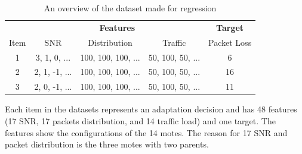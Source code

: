 \documentclass[a4paper,12pt]{article}
\begin{document}
\begin{table}[H]
	\centering
	\begin{tabular}{c|c|c|c|c}
		\hline
		\multicolumn{1}{c|}{} & \multicolumn{3}{c|}{\textbf{Features}} & \multicolumn{1}{c}{\textbf{Target}} \\
		\cline{1-1} \cline{2-4} \cline{5-5}
		\multicolumn{1}{c|}{Item} & \multicolumn{1}{c|}{SNR} & \multicolumn{1}{c|}{Distribution} & \multicolumn{1}{c|}{Traffic} & \multicolumn{1}{c}{Packet Loss} \\
		\cline{1-1} \cline{2-2} \cline{3-3} \cline{4-4} \cline{5-5}
		1 & 3, 1, 0, ... & 100, 100, 100, ... & 50, 100, 50, ... & 6 \\
		\hline
		2 & 2, 1, -1, ... & 100, 100, 100, ... & 50, 100, 50, ... & 16 \\
		\hline
		3 & 2, 0, -1, ... & 100, 100, 100, ... & 50, 100, 50, ... & 11 \\
		\hline
	\end{tabular}
	\caption{An overview of the dataset made for regression}
	\label{DeltaIoTRegression}
\end{table}
Each item in the datasets represents an adaptation decision and has 48 features (17 SNR, 17 packets distribution, and 14 traffic load) and one target. The features show the configurations of the 14 motes. The reason for 17 SNR and packet distribution is the three motes with two parents.
\end{document}
